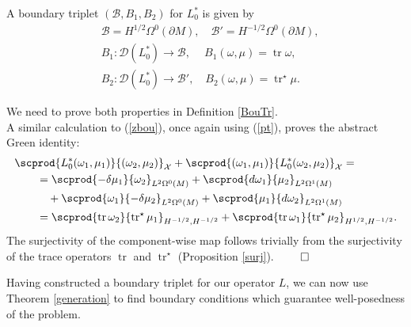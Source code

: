 \documentclass{ifacconf}
\newcommand{\tr}{\operatorname{tr}}
\newcommand{\drh}[2]{\Omega^{#2}(#1)}
\begin{document}
\begin{thm}
    A boundary triplet $(\mathcal{B},B_1,B_2)$ for $L_0^*$ is given by
    \begin{align*}
    &\mathcal{B}=H^{1/2}\drh{\partial M}{0},\quad \mathcal{B}'=H^{-1/2}\drh{\partial M}{0},\\
    &B_1\colon \mathcal{D}(L_0^*)\to \mathcal{B},\quad \ B_1(\omega,\mu)=\tr\omega, \\ 
    &B_2\colon \mathcal{D}(L_0^*)\to\mathcal{B}',\quad B_2(\omega,\mu)=\tr^{\star}\mu.\end{align*}
    \begin{pf}
        We need to prove both properties in Definition \ref{BouTr}.\\
        A similar calculation to (\ref{zbou}), once again using (\ref{pt}), proves the abstract Green identity:
        \begin{align*}
        \MoveEqLeft
        \scprod{L_0^*(\omega_1,\mu_1)}{(\omega_2,\mu_2)}_{\mathcal{X}}+\scprod{(\omega_1,\mu_1)}{L_0^*(\omega_2,\mu_2)}_{\mathcal{X}}=\\
        & = \scprod{-\delta\mu_1}{\omega_2}_{L^2\drh{M}{0}}+\scprod{d\omega_1}{\mu_2}_{L^2\drh{M}{1}} \\
        &\quad + \scprod{\omega_1}{-\delta\mu_2}_{L^2\drh{M}{0}}+ \scprod{\mu_1}{d\omega_2}_{L^2\drh{M}{1}}\\
        &= \scprod{\tr\omega_2}{\tr^{\star}\mu_1}_{H^{-1/2},H^{-1/2}}
        +\scprod{\tr\omega_1}{\tr^{\star}\mu_2}_{H^{1/2},H^{-1/2}}.
        \end{align*}
        The surjectivity of the component-wise map follows trivially from the surjectivity of the trace operators $\tr$ and $\tr^{\star}$ (Proposition \ref{surj}). \hfill $\qed$
    \end{pf}
\end{thm}

Having constructed a boundary triplet for our operator $L$, we can now use Theorem \ref{generation} to find boundary conditions which guarantee well-posedness of the problem.
\end{document}

